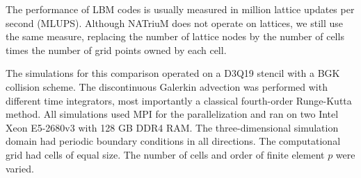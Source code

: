 \documentclass[1p, sort&compress]{elsarticle}
\begin{document}
The performance of LBM codes is usually measured in million lattice updates per second (MLUPS). Although NATriuM does not operate on lattices, we still use the same measure, replacing the number of lattice nodes by the number of cells times the number of grid points owned by each cell.

The simulations for this comparison operated on a D3Q19 stencil with a BGK collision scheme. The discontinuous Galerkin advection was performed with different time integrators, most importantly a classical fourth-order Runge-Kutta method. All simulations used MPI for the parallelization and ran on two Intel Xeon E5-2680v3 with 128 GB DDR4 RAM. The three-dimensional simulation domain had periodic boundary conditions in all directions. The computational grid had cells of equal size. The number of cells and order of finite element $p$ were varied.
\end{document}
